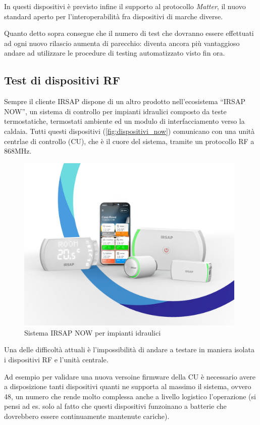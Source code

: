 \documentclass[12pt,a4paper,twoside,titlepage]{book}
\begin{document}
In questi dispositivi è previsto infine il supporto al protocollo \textit{Matter},
il nuovo standard aperto per l'interoperabilità fra dispositivi di marche diverse.

Quanto detto sopra consegue che il numero di test che dovranno essere effettuati ad
ogni nuovo rilascio aumenta di parecchio: diventa ancora più vantaggioso andare ad
utilizzare le procedure di testing automatizzato visto fin ora.

\subsection{Test di dispositivi RF}

Sempre il cliente IRSAP dispone di un altro prodotto nell'ecosistema ``IRSAP NOW'',
un sistema di controllo per impianti idraulici composto da teste termostatiche,
termostati ambiente ed un modulo di interfacciamento verso la caldaia. Tutti questi
dispositivi (\autoref{fig:dispositivi_now}) comunicano con una unità centrlae di controllo
(CU), che è il cuore del sistema, tramite un protocollo RF a 868MHz.

\begin{figure}[h]
    \centering
    \includegraphics[width=11cm]{img/now.jpeg}
    \caption{Sistema IRSAP NOW per impianti idraulici}
    \label{fig:dispositivi_now}
\end{figure}

Una delle difficoltà attuali è l'impossibilità di andare a testare in maniera isolata i
dispositivi RF e l'unità centrale.

Ad esempio per validare una nuova versoine firmware della CU è necessario avere a disposizione tanti dispositivi quanti
ne supporta al massimo il sistema, ovvero 48, un numero che rende molto complessa anche a
livello logistico l'operazione (si pensi ad es. solo al fatto che questi dispositivi funzoinano a
batterie che dovrebbero essere continuamente mantenute cariche).
\end{document}

